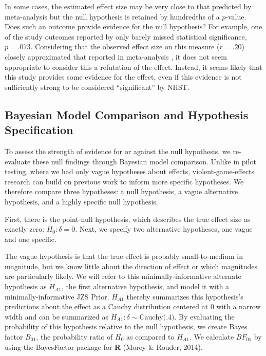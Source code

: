 \documentclass[man]{apa6}
\begin{document}
In some cases, the estimated effect size may be very close to that predicted by meta-analysis but the null hypothesis is retained by hundredths of a $p$-value. Does such an outcome provide evidence for the null hypothesis? For example, one of the study outcomes reported by \citet{Elson:etal:2013} only barely missed statistical significance, $p = .073$. Considering that the observed effect size on this measure ($r = .20$) closely approximated that reported in meta-analysis \citep[$r = .21$,][]{Anderson:etal:2010}, it does not seem appropriate to consider this a refutation of the effect. Instead, it seems likely that this study provides some evidence for the effect, even if this evidence is not sufficiently strong to be considered ``significant'' by NHST. 

\subsection{Bayesian Model Comparison and Hypothesis Specification}
To assess the strength of evidence for or against the null hypothesis, we re-evaluate these null findings through Bayesian model comparison. Unlike in pilot testing, where we had only vague hypotheses about effects, violent-game-effects research can build on previous work to inform more specific hypotheses. We therefore compare three hypotheses: a null hypothesis, a vague alternative hypothesis, and a highly specific null hypothesis. 

First, there is the point-null hypothesis, which describes the true effect size as exactly zero: $H_0: \delta = 0$. Next, we specify two alternative hypotheses, one vague and one specific. 

The vague hypothesis is that the true effect is probably small-to-medium in magnitude, but we know little about the direction of effect or which magnitudes are particularly likely. We will refer to this minimally-informative alternate hypothesis as $H_{A1}$, the first alternative hypothesis, and model it with a minimally-informative JZS Prior. $H_{A1}$ thereby summarizes this hypothesis's predictions about the effect as a Cauchy distribution centered at 0 with a narrow width and can be summarized as $H_{A1}: \delta{} \sim{} \mbox{Cauchy(.4)}$. By evaluating the probability of this hypothesis relative to the null hypothesis, we create Bayes factor $B_{01}$, the probability ratio of $H_0$ as compared to $H_{A1}$. We calculate $BF_{01}$ by using the BayesFactor package for \textbf{R} (Morey \& Rouder, 2014).
\end{document}
